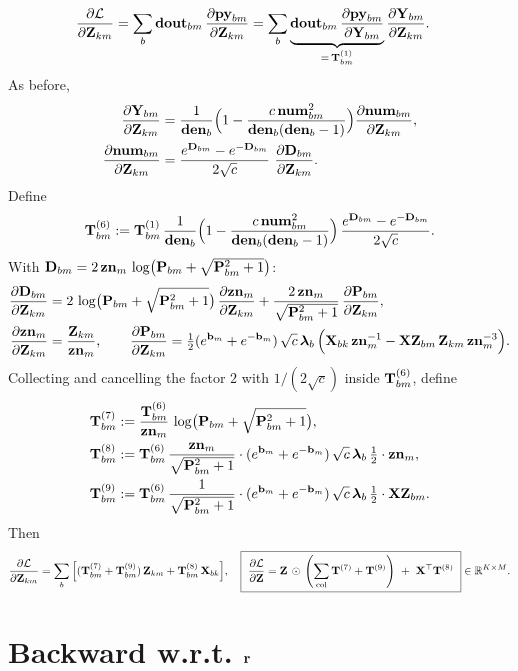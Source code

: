 \documentclass{article}
\begin{document}
\begin{align}
\ddfrac{\mathcal{L}}{\v{Z}{km}}
&= \sum_b \v{dout}{bm}\,\ddfrac{\v{py}{bm}}{\v{Z}{km}}
= \sum_b \underbrace{\v{dout}{bm}\,\ddfrac{\v{py}{bm}}{\v{Y}{bm}}}_{=\,\T{1}{bm}}\ddfrac{\v{Y}{bm}}{\v{Z}{km}}.
\end{align}
As before,
\begin{align}
\ddfrac{\v{Y}{bm}}{\v{Z}{km}}
&= \frac{1}{\v{den}{b}}\Big(1-\frac{c\,\v{num}{bm}^2}{\v{den}{b}(\v{den}{b}-1)}\Big)
\ddfrac{\v{num}{bm}}{\v{Z}{km}},\\
\ddfrac{\v{num}{bm}}{\v{Z}{km}}
&= \frac{\ev{D}{bm}-\ev{-D}{bm}}{2\sqrt{c}}\ \ddfrac{\v{D}{bm}}{\v{Z}{km}}.
\end{align}
Define
\[
\T{6}{bm}:= \T{1}{bm}\,\frac{1}{\v{den}{b}}\Big(1-\frac{c\,\v{num}{bm}^2}{\v{den}{b}(\v{den}{b}-1)}\Big)\,\frac{\ev{D}{bm}-\ev{-D}{bm}}{2\sqrt{c}}.
\]
With $\v{D}{bm}=2\,\v{zn}{m}\,\log\!\big(\v{P}{bm}+\sqrt{\v{P}{bm}^2+1}\big)$:
\begin{align}
\ddfrac{\v{D}{bm}}{\v{Z}{km}}
&= 2\,\log\!\big(\v{P}{bm}+\sqrt{\v{P}{bm}^2+1}\big)\,\ddfrac{\v{zn}{m}}{\v{Z}{km}}
+ \frac{2\,\v{zn}{m}}{\sqrt{\v{P}{bm}^2+1}}\,\ddfrac{\v{P}{bm}}{\v{Z}{km}},
\\
\ddfrac{\v{zn}{m}}{\v{Z}{km}} &= \frac{\v{Z}{km}}{\v{zn}{m}},\qquad
\ddfrac{\v{P}{bm}}{\v{Z}{km}}
= \tfrac12(\ev{b}{m}+\ev{-b}{m})\,\sqrt{c}\,\lam_b\,
\Big(\v{X}{bk}\,\v{zn}{m}^{-1} - \v{XZ}{bm}\,\v{Z}{km}\,\v{zn}{m}^{-3}\Big).
\end{align}
Collecting and cancelling the factor $2$ with $1/(2\sqrt{c})$ inside $\T{6}{bm}$, define
\begin{align}
\T{7}{bm} &:= \frac{\T{6}{bm}}{\v{zn}{m}}\,\log\!\big(\v{P}{bm}+\sqrt{\v{P}{bm}^2+1}\big),\\
\T{8}{bm} &:= \T{6}{bm}\,\frac{\v{zn}{m}}{\sqrt{\v{P}{bm}^2+1}}
\cdot (\ev{b}{m}+\ev{-b}{m})\,\sqrt{c}\,\lam_b\,\tfrac{1}{2}\cdot \v{zn}{m},\\
\T{9}{bm} &:= \T{6}{bm}\,\frac{1}{\sqrt{\v{P}{bm}^2+1}}
\cdot (\ev{b}{m}+\ev{-b}{m})\,\sqrt{c}\,\lam_b\,\tfrac{1}{2}\cdot \v{XZ}{bm}.
\end{align}
Then
\[
\ddfrac{\mathcal{L}}{\v{Z}{km}}
= \sum_b \Big[(\T{7}{bm}+\T{9}{bm})\,\v{Z}{km} + \T{8}{bm}\,\v{X}{bk}\Big],
\quad
\boxed{\ \ddfrac{\mathcal{L}}{\v{Z}} = \v{Z}\,\odot\,\colnorm{\T{7}+\T{9}}\ +\ \v{X}^\top \T{8}\ }\in\mathbb{R}^{K\times M}.
\]

\section{Backward w.r.t. $\v{r}$}
\end{document}
